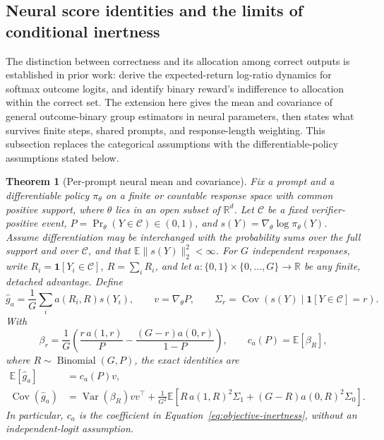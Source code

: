 \documentclass{article}
\newcommand{\enforcehalffinalproseline}{%
  \setlength{\parfillskip}{0pt plus .20\linewidth}}
\newcommand{\1}{\mathbf 1}
\newcommand{\E}{\mathbb E}
\newtheorem{theorem}[lemma]{Theorem}
\theoremstyle{remark}
\theoremstyle{definition}
\theoremstyle{plain}
\begin{document}
\subsection{Neural score identities and the limits of conditional inertness}
\label{app:neural-binary-inertness}

The distinction between correctness and its allocation among correct outputs
is established in prior work: \citet[Theorem~3.1, v1]{sinha2026expected}
derive the expected-return log-ratio dynamics for softmax outcome logits,
and \citet[Section~4.1, v1]{lochab2026ucpo} identify binary reward's
indifference to allocation within the correct set. The extension here gives
the mean and covariance of general outcome-binary group estimators in neural
parameters, then states what survives finite steps, shared prompts, and
response-length weighting. This subsection replaces the categorical
assumptions with the differentiable-policy assumptions stated below.

\begin{theorem}[Per-prompt neural mean and covariance]
\enforcehalffinalproseline
\label{thm:neural-binary-moments}
Fix a prompt and a differentiable policy $\pi_\theta$ on a finite or countable
response space with common positive support, where $\theta$ lies in an open
subset of $\mathbb R^d$. Let $\mathcal C$ be a fixed verifier-positive event,
$P=\Pr_\theta(Y\in\mathcal C)\in(0,1)$, and
$s(Y)=\nabla_\theta\log\pi_\theta(Y)$. Assume differentiation may be
interchanged with the probability sums over the full support and over
$\mathcal C$, and that $\E\|s(Y)\|_2^2<\infty$. For $G$ independent
responses, write $R_i=\1[Y_i\in\mathcal C]$, $R=\sum_iR_i$, and let
$a:\{0,1\}\times\{0,\ldots,G\}\to\mathbb R$ be any finite, detached
advantage. Define
\[
 \widehat g_a=\frac1G\sum_i a(R_i,R)s(Y_i),\qquad
 v=\nabla_\theta P,\qquad
 \Sigma_r=\operatorname{Cov}\!\left(s(Y)\mid\1[Y\in\mathcal C]=r\right).
\]
With
\[
 \beta_r=\frac1G\left(\frac{r\,a(1,r)}P
          -\frac{(G-r)a(0,r)}{1-P}\right),
 \qquad c_a(P)=\E[\beta_R],
\]
where $R\sim\operatorname{Binomial}(G,P)$, the exact identities are
\begin{align}
 \E[\widehat g_a]&=c_a(P)v,
 \label{eq:neural-binary-mean}\\
 \operatorname{Cov}(\widehat g_a)
 &=\operatorname{Var}(\beta_R)vv^\top
   +\frac1{G^2}\E\!\left[
       R\,a(1,R)^2\Sigma_1+(G-R)a(0,R)^2\Sigma_0\right].
 \label{eq:neural-binary-covariance}
\end{align}
In particular, $c_a$ is the coefficient in
Equation~\eqref{eq:objective-inertness}, without an independent-logit
assumption.
\end{theorem}
\end{document}
